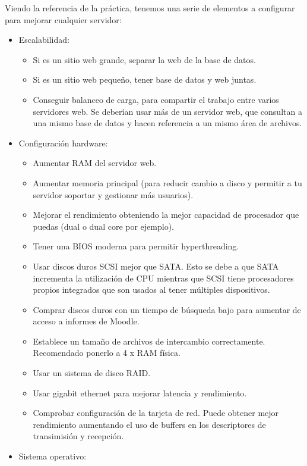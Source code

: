 	Viendo la referencia de la práctica\cite{ejercicio4-1}, tenemos una serie de elementos a configurar para mejorar cualquier servidor:
	
	\begin{itemize}
		\item Escalabilidad:
		\begin{itemize}
			\item Si es un sitio web grande, separar la web de la base de datos.
			\item Si es un sitio web pequeño, tener base de datos y web juntas.
			\item Conseguir balanceo de carga, para compartir el trabajo entre varios servidores web. Se deberían usar más de un servidor web, que consultan a una mismo base de datos y hacen referencia a un mismo área de archivos.
		\end{itemize}
		\item Configuración hardware:
		\begin{itemize}
			\item Aumentar RAM del servidor web.
			\item Aumentar memoria principal (para reducir cambio a disco y permitir a tu servidor soportar y gestionar más usuarios).
			\item Mejorar el rendimiento obteniendo la mejor capacidad de procesador que puedas (dual o dual core por ejemplo).
			\item Tener una BIOS moderna para permitir hyperthreading.
			\item Usar discos duros SCSI mejor que SATA. Esto se debe a que SATA incrementa la utilización de CPU mientras que SCSI tiene procesadores propios integrados que son usados al tener múltiples dispositivos.
			\item Comprar discos duros con un tiempo de búsqueda bajo para aumentar de acceso a informes de Moodle.
			\item Establece un tamaño de archivos de intercambio correctamente. Recomendado ponerlo a 4 x RAM física.
			\item Usar un sistema de disco RAID.
			\item Usar gigabit ethernet para mejorar latencia y rendimiento.
			\item Comprobar configuración de la tarjeta de red. Puede obtener mejor rendimiento aumentando el uso de buffers en los descriptores de transimisión y recepción.
		\end{itemize}
		\item Sistema operativo:
		\begin{itemize}

\end{itemize}
\end{itemize}
